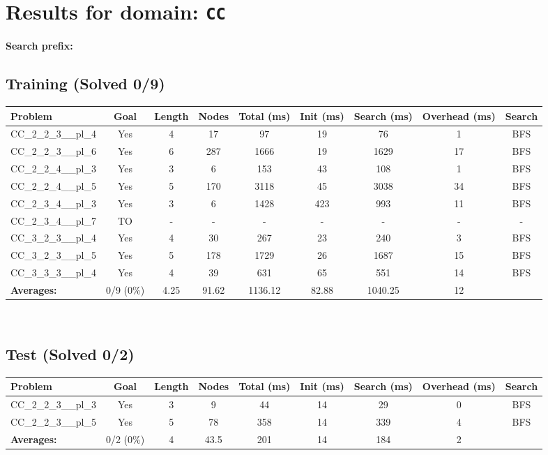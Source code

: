 \documentclass{article}
\begin{document}
\section*{Results for domain: \texttt{CC}}
\textbf{Search prefix:} 
\\[0.5cm]
\subsection*{Training (Solved 0/9)}
\begin{tabular}{lcccccccc}
\toprule
Problem & Goal & Length & Nodes & Total (ms) & Init (ms) & Search (ms) & Overhead (ms) & Search \\
\midrule
CC\_2\_2\_3\_\_pl\_4 & Yes & 4 & 17 & 97 & 19 & 76 & 1 & BFS \\
CC\_2\_2\_3\_\_pl\_6 & Yes & 6 & 287 & 1666 & 19 & 1629 & 17 & BFS \\
CC\_2\_2\_4\_\_pl\_3 & Yes & 3 & 6 & 153 & 43 & 108 & 1 & BFS \\
CC\_2\_2\_4\_\_pl\_5 & Yes & 5 & 170 & 3118 & 45 & 3038 & 34 & BFS \\
CC\_2\_3\_4\_\_pl\_3 & Yes & 3 & 6 & 1428 & 423 & 993 & 11 & BFS \\
CC\_2\_3\_4\_\_pl\_7 & TO & - & - & - & - & - & - & - \\
CC\_3\_2\_3\_\_pl\_4 & Yes & 4 & 30 & 267 & 23 & 240 & 3 & BFS \\
CC\_3\_2\_3\_\_pl\_5 & Yes & 5 & 178 & 1729 & 26 & 1687 & 15 & BFS \\
CC\_3\_3\_3\_\_pl\_4 & Yes & 4 & 39 & 631 & 65 & 551 & 14 & BFS \\
\textbf{Averages:} & 0/9 (0\%) & 4.25 & 91.62 & 1136.12 & 82.88 & 1040.25 & 12 & \\
\bottomrule
\end{tabular}
\\[0.7cm]
\subsection*{Test (Solved 0/2)}
\begin{tabular}{lcccccccc}
\toprule
Problem & Goal & Length & Nodes & Total (ms) & Init (ms) & Search (ms) & Overhead (ms) & Search \\
\midrule
CC\_2\_2\_3\_\_pl\_3 & Yes & 3 & 9 & 44 & 14 & 29 & 0 & BFS \\
CC\_2\_2\_3\_\_pl\_5 & Yes & 5 & 78 & 358 & 14 & 339 & 4 & BFS \\
\textbf{Averages:} & 0/2 (0\%) & 4 & 43.5 & 201 & 14 & 184 & 2 & \\
\bottomrule
\end{tabular}
\\[0.7cm]
\end{document}

